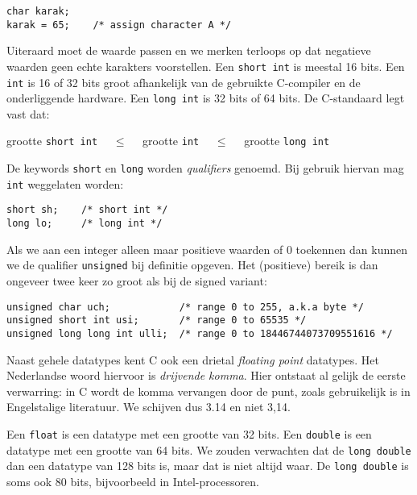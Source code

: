 \hspace*{1em}\texttt{char karak;}\\
\hspace*{1em}\texttt{karak = 65; \ \ \ /* assign character A */}

Uiteraard moet de waarde passen en we merken terloops op dat negatieve waarden geen echte karakters voorstellen. Een \texttt{short int} is meestal 16 bits. Een \texttt{int} is 16 of 32 bits groot afhankelijk van de gebruikte C-compiler en de onderliggende hardware. Een \texttt{long int} is 32 bits of 64 bits. De C-standaard legt vast dat:

\hspace*{1em}grootte \texttt{short int} $\quad\leq\quad$ grootte \texttt{int} $\quad\leq\quad$ grootte \texttt{long int}

De keywords \texttt{short} en \texttt{long} worden \textsl{qualifiers} genoemd. Bij gebruik hiervan mag \texttt{int} weggelaten worden:

\hspace*{1em}\texttt{short sh; \ \ \ /* short int */}\\
\hspace*{1em}\texttt{long lo; \ \ \ \ /* long int */}

Als we aan een integer alleen maar positieve waarden of 0 toekennen dan kunnen we de qualifier \texttt{unsigned} bij definitie opgeven. Het (positieve) bereik is dan ongeveer twee keer zo groot als bij de signed variant:

\hspace*{1em}\texttt{unsigned char uch; \ \ \ \ \ \ \ \ \ \ \ /* range 0 to 255, a.k.a byte */}\\
\hspace*{1em}\texttt{unsigned short int usi; \ \ \ \ \ \ /* range 0 to 65535 */}\\
\hspace*{1em}\texttt{unsigned long long int ulli; \ /* range 0 to 18446744073709551616 */}

Naast gehele datatypes kent C ook een drietal \textsl{floating point} datatypes. Het Nederlandse woord hiervoor is \textsl{drijvende komma}. Hier ontstaat al gelijk de eerste verwarring: in C wordt de komma vervangen door de punt, zoals gebruikelijk is in Engelstalige literatuur. We schijven dus 3.14 en niet 3,14.

Een \texttt{float} is een datatype met een grootte van 32 bits. Een \texttt{double} is een datatype met een grootte van 64 bits. We zouden verwachten dat de \texttt{long double} dan een datatype van 128 bits is, maar dat is niet altijd waar. De \texttt{long double} is soms ook 80 bits, bijvoorbeeld in Intel-processoren.


